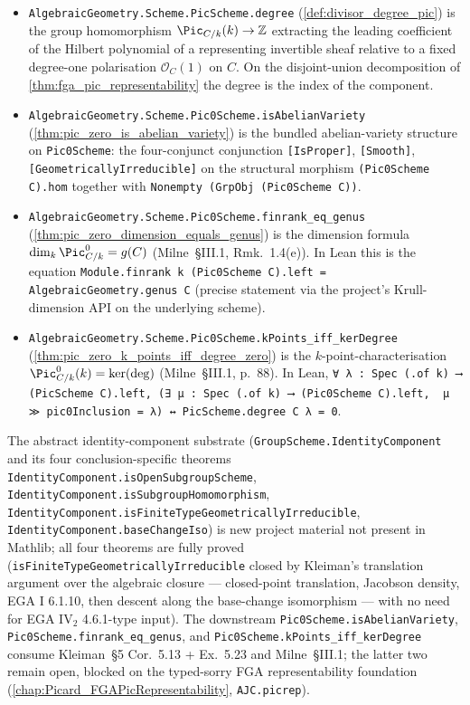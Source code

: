\begin{itemize}
    \cref{thm:pic_is_group_scheme}.
  \item \texttt{AlgebraicGeometry.Scheme.PicScheme.degree}
    (\cref{def:divisor_degree_pic}) is the group homomorphism
    \(\Pic_{C/k}(k) \to \mathbb{Z}\) extracting the leading coefficient
    of the Hilbert polynomial of a representing invertible sheaf
    relative to a fixed degree-one polarisation \(\mathcal{O}_C(1)\) on
    \(C\). On the disjoint-union decomposition of
    \cref{thm:fga_pic_representability} the degree is the index of the
    component.
  \item \texttt{AlgebraicGeometry.Scheme.Pic0Scheme.isAbelianVariety}
    (\cref{thm:pic_zero_is_abelian_variety}) is the bundled
    abelian-variety structure on \texttt{Pic0Scheme}: the four-conjunct
    conjunction \texttt{[IsProper]}, \texttt{[Smooth]},
    \texttt{[GeometricallyIrreducible]} on the structural morphism
    \texttt{(Pic0Scheme C).hom} together with
    \texttt{Nonempty (GrpObj (Pic0Scheme C))}.
  \item \texttt{AlgebraicGeometry.Scheme.Pic0Scheme.finrank_eq_genus}
    (\cref{thm:pic_zero_dimension_equals_genus}) is the dimension
    formula \(\dim_k \Pic^0_{C/k} = g(C)\) (Milne~\S III.1,
    Rmk.~1.4(e)). In Lean this is the equation
    \texttt{Module.finrank k (Pic0Scheme C).left = AlgebraicGeometry.genus C}
    (precise statement via the project's Krull-dimension API on the
    underlying scheme).
  \item \texttt{AlgebraicGeometry.Scheme.Pic0Scheme.kPoints_iff_kerDegree}
    (\cref{thm:pic_zero_k_points_iff_degree_zero}) is the
    \(k\)-point-characterisation
    \(\Pic^0_{C/k}(k) = \ker(\deg)\) (Milne~\S III.1, p.~88). In Lean,
    \texttt{∀ λ : Spec (.of k) ⟶ (PicScheme C).left,
    (∃ μ : Spec (.of k) ⟶ (Pic0Scheme C).left,\,
    μ ≫ pic0Inclusion = λ) ↔ PicScheme.degree C λ = 0}.
\end{itemize}

The abstract identity-component substrate
(\texttt{GroupScheme.IdentityComponent} and its four
conclusion-specific theorems
\texttt{IdentityComponent.isOpenSubgroupScheme},
\texttt{IdentityComponent.isSubgroupHomomorphism},
\texttt{IdentityComponent.isFiniteTypeGeometricallyIrreducible},
\texttt{IdentityComponent.baseChangeIso}) is new project material not
present in Mathlib; all four theorems are fully proved
(\texttt{isFiniteTypeGeometricallyIrreducible} closed by Kleiman's
translation argument over the algebraic closure --- closed-point
translation, Jacobson density, EGA I 6.1.10, then descent along the
base-change isomorphism --- with no need for EGA IV\(_2\) 4.6.1-type
input). The downstream
\texttt{Pic0Scheme.isAbelianVariety},
\texttt{Pic0Scheme.finrank\_eq\_genus}, and
\texttt{Pic0Scheme.kPoints\_iff\_kerDegree} consume Kleiman~\S 5
Cor.~5.13 + Ex.~5.23 and Milne~\S III.1; the latter two remain open,
blocked on the typed-sorry FGA representability foundation
(\cref{chap:Picard_FGAPicRepresentability}, \texttt{AJC.picrep}).

